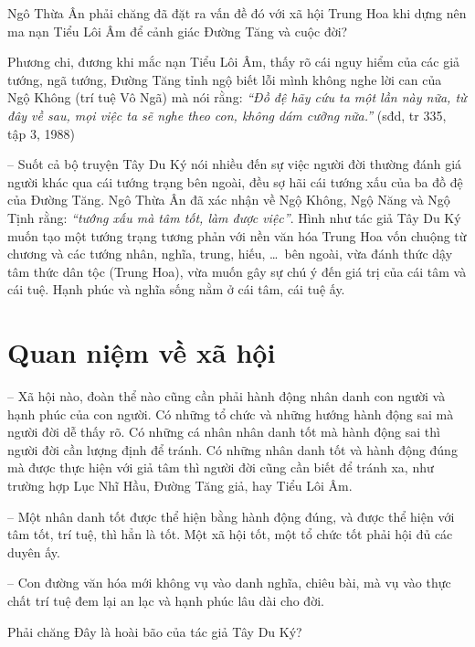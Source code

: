 Ngô Thừa Ân phải chăng đã đặt ra vấn đề đó với xã hội Trung Hoa khi dựng nên ma nạn Tiểu Lôi Âm để cảnh giác Đường Tăng và cuộc đời?

Phương chi, đương khi mắc nạn Tiểu Lôi Âm, thấy rõ cái nguy hiểm của các giả tướng, ngã tướng, Đường Tăng tỉnh ngộ biết lỗi mình không nghe lời can của Ngộ Không (trí tuệ Vô Ngã) mà nói rằng: \emph{``Đồ đệ hãy cứu ta một lần này nữa, từ đây về sau, mọi việc ta sẽ nghe theo con, không dám cưỡng nữa.''} (sđd, tr 335, tập 3, 1988)

-- Suốt cả bộ truyện Tây Du Ký nói nhiều đến sự việc người đời thường đánh giá người khác qua cái tướng trạng bên ngoài, đều sợ hãi cái tướng xấu của ba đồ đệ của Đường Tăng. Ngô Thừa Ân đã xác nhận về Ngộ Không, Ngộ Năng và Ngộ Tịnh rằng: \emph{``tướng xấu mà tâm tốt, làm được việc''}. Hình như tác giả Tây Du Ký muốn tạo một tướng trạng tương phản với nền văn hóa Trung Hoa vốn chuộng từ chương và các tướng nhân, nghĩa, trung, hiếu, \ldots ~bên ngoài, vừa đánh thức dậy tâm thức dân tộc (Trung Hoa), vừa muốn gây sự chú ý đến giá trị của cái tâm và cái tuệ. Hạnh phúc và nghĩa sống nằm ở cái tâm, cái tuệ ấy.

\section{Quan niệm về xã hội} %
\label{sec:65_66_xa_hoi}

-- Xã hội nào, đoàn thể nào cũng cần phải hành động nhân danh con người và hạnh phúc của con người. Có những tổ chức và những hướng hành động sai mà người đời dễ thấy rõ. Có những cá nhân nhân danh tốt mà hành động sai thì người đời cần lượng định để tránh. Có những nhân danh tốt và hành động đúng mà được thực hiện với giả tâm thì người đời cũng cần biết để tránh xa, như trường hợp Lục Nhĩ Hầu, Đường Tăng giả, hay Tiểu Lôi Âm.

-- Một nhân danh tốt được thể hiện bằng hành động đúng, và được thể hiện với tâm tốt, trí tuệ, thì hẳn là tốt. Một xã hội tốt, một tổ chức tốt phải hội đủ các duyên ấy.

-- Con đường văn hóa mới không vụ vào danh nghĩa, chiêu bài, mà vụ vào thực chất trí tuệ đem lại an lạc và hạnh phúc lâu dài cho đời.

Phải chăng Đây là hoài bão của tác giả Tây Du Ký?
